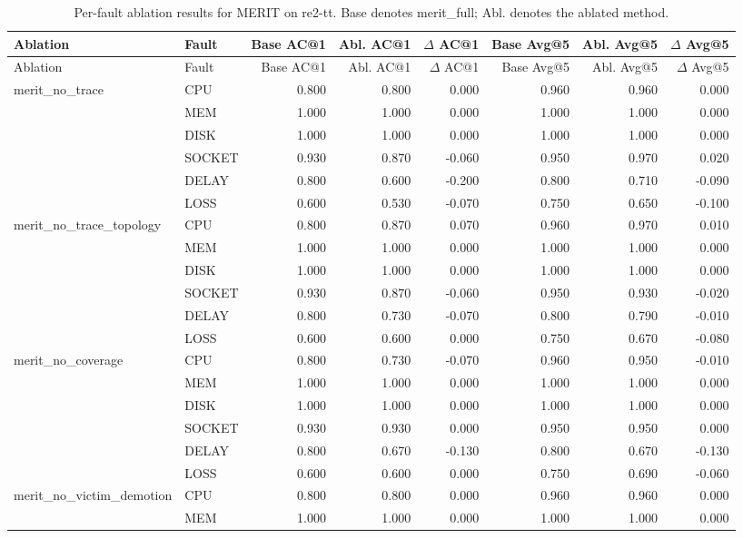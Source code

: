 \begin{longtable}{llrrrrrr}
\caption{Per-fault ablation results for MERIT on re2-tt. Base denotes merit\_full; Abl. denotes the ablated method.}\label{tab:merit-re2tt-fault-ablation}\\
\toprule
Ablation & Fault & Base AC@1 & Abl. AC@1 & $\Delta$ AC@1 & Base Avg@5 & Abl. Avg@5 & $\Delta$ Avg@5 \\
\midrule
\endfirsthead
\toprule
Ablation & Fault & Base AC@1 & Abl. AC@1 & $\Delta$ AC@1 & Base Avg@5 & Abl. Avg@5 & $\Delta$ Avg@5 \\
\midrule
\endhead
merit\_no\_trace & CPU & 0.800 & 0.800 & 0.000 & 0.960 & 0.960 & 0.000 \\
 & MEM & 1.000 & 1.000 & 0.000 & 1.000 & 1.000 & 0.000 \\
 & DISK & 1.000 & 1.000 & 0.000 & 1.000 & 1.000 & 0.000 \\
 & SOCKET & 0.930 & 0.870 & -0.060 & 0.950 & 0.970 & 0.020 \\
 & DELAY & 0.800 & 0.600 & -0.200 & 0.800 & 0.710 & -0.090 \\
 & LOSS & 0.600 & 0.530 & -0.070 & 0.750 & 0.650 & -0.100 \\
merit\_no\_trace\_topology & CPU & 0.800 & 0.870 & 0.070 & 0.960 & 0.970 & 0.010 \\
 & MEM & 1.000 & 1.000 & 0.000 & 1.000 & 1.000 & 0.000 \\
 & DISK & 1.000 & 1.000 & 0.000 & 1.000 & 1.000 & 0.000 \\
 & SOCKET & 0.930 & 0.870 & -0.060 & 0.950 & 0.930 & -0.020 \\
 & DELAY & 0.800 & 0.730 & -0.070 & 0.800 & 0.790 & -0.010 \\
 & LOSS & 0.600 & 0.600 & 0.000 & 0.750 & 0.670 & -0.080 \\
merit\_no\_coverage & CPU & 0.800 & 0.730 & -0.070 & 0.960 & 0.950 & -0.010 \\
 & MEM & 1.000 & 1.000 & 0.000 & 1.000 & 1.000 & 0.000 \\
 & DISK & 1.000 & 1.000 & 0.000 & 1.000 & 1.000 & 0.000 \\
 & SOCKET & 0.930 & 0.930 & 0.000 & 0.950 & 0.950 & 0.000 \\
 & DELAY & 0.800 & 0.670 & -0.130 & 0.800 & 0.670 & -0.130 \\
 & LOSS & 0.600 & 0.600 & 0.000 & 0.750 & 0.690 & -0.060 \\
merit\_no\_victim\_demotion & CPU & 0.800 & 0.800 & 0.000 & 0.960 & 0.960 & 0.000 \\
 & MEM & 1.000 & 1.000 & 0.000 & 1.000 & 1.000 & 0.000 \\

\end{longtable}
